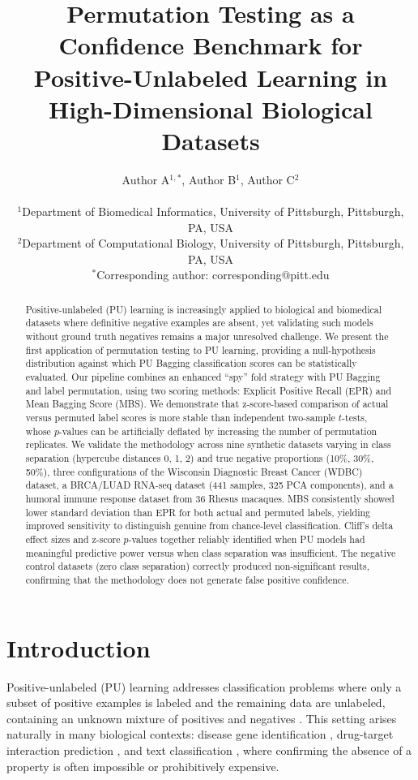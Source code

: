 \documentclass[11pt]{article}
\title{Permutation Testing as a Confidence Benchmark for Positive-Unlabeled Learning in High-Dimensional Biological Datasets}
\author{
Author A$^{1,*}$, Author B$^{1}$, Author C$^{2}$ \\
\\
\small $^{1}$Department of Biomedical Informatics, University of Pittsburgh, Pittsburgh, PA, USA \\
\small $^{2}$Department of Computational Biology, University of Pittsburgh, Pittsburgh, PA, USA \\
\small $^{*}$Corresponding author: corresponding@pitt.edu
}
\date{}
\begin{document}
\maketitle

\begin{abstract}
Positive-unlabeled (PU) learning is increasingly applied to biological and biomedical datasets where definitive negative examples are absent, yet validating such models without ground truth negatives remains a major unresolved challenge. We present the first application of permutation testing to PU learning, providing a null-hypothesis distribution against which PU Bagging classification scores can be statistically evaluated. Our pipeline combines an enhanced ``spy'' fold strategy with PU Bagging and label permutation, using two scoring methods: Explicit Positive Recall (EPR) and Mean Bagging Score (MBS). We demonstrate that z-score-based comparison of actual versus permuted label scores is more stable than independent two-sample $t$-tests, whose $p$-values can be artificially deflated by increasing the number of permutation replicates. We validate the methodology across nine synthetic datasets varying in class separation (hypercube distances 0, 1, 2) and true negative proportions (10\%, 30\%, 50\%), three configurations of the Wisconsin Diagnostic Breast Cancer (WDBC) dataset, a BRCA/LUAD RNA-seq dataset (441 samples, 325 PCA components), and a humoral immune response dataset from 36 Rhesus macaques. MBS consistently showed lower standard deviation than EPR for both actual and permuted labels, yielding improved sensitivity to distinguish genuine from chance-level classification. Cliff's delta effect sizes and z-score $p$-values together reliably identified when PU models had meaningful predictive power versus when class separation was insufficient. The negative control datasets (zero class separation) correctly produced non-significant results, confirming that the methodology does not generate false positive confidence.
\end{abstract}

\section{Introduction}

Positive-unlabeled (PU) learning addresses classification problems where only a subset of positive examples is labeled and the remaining data are unlabeled, containing an unknown mixture of positives and negatives \citep{elkan2008, bekker2020}. This setting arises naturally in many biological contexts: disease gene identification \citep{yang2012}, drug-target interaction prediction \citep{cerulo2010}, and text classification \citep{liu2002, li2003}, where confirming the absence of a property is often impossible or prohibitively expensive.
\end{document}
